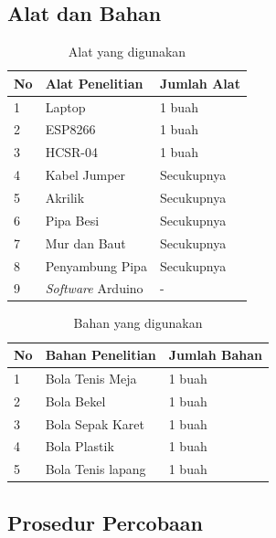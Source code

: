 \documentclass[a4paper, 12pt]{article}
\begin{document}
\subsection{Alat dan Bahan}
\begin{table}[!ht]
    \centering
    \caption{Alat yang digunakan}
    \label{tab:alat}
    \begin{tabular}{|l|l|l|}
        \hline
        \textbf{No} & \textbf{Alat Penelitian} & \textbf{Jumlah Alat} \\
        \hline
        1 & Laptop & 1 buah \\
        \hline
        2 & ESP8266 & 1 buah \\
        \hline
        3 & HCSR-04 & 1 buah \\
        \hline
        4 & Kabel Jumper & Secukupnya \\
        \hline
        5 & Akrilik & Secukupnya \\
        \hline
        6 & Pipa Besi & Secukupnya \\
        \hline
        7 & Mur dan Baut & Secukupnya \\
        \hline
        8 & Penyambung Pipa & Secukupnya \\
        \hline
        9 & \textit{Software} Arduino & - \\
        \hline
    \end{tabular}
\end{table}

\begin{table}[!ht]
    \centering
    \caption{Bahan yang digunakan}
    \label{tab:bahan}
    \begin{tabular}{|l|l|l|}
        \hline
        \textbf{No} & \textbf{Bahan Penelitian} & \textbf{Jumlah Bahan} \\
        \hline
        1 & Bola Tenis Meja & 1 buah \\
        \hline
        2 & Bola Bekel & 1 buah \\
        \hline
        3 & Bola Sepak Karet & 1 buah \\
        \hline
        4 & Bola Plastik & 1 buah \\
        \hline
        5 & Bola Tenis lapang & 1 buah \\
        \hline
    \end{tabular}
\end{table}

\subsection{Prosedur Percobaan}
\end{document}
